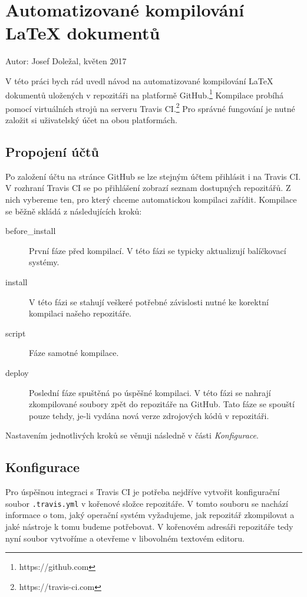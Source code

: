 \documentclass[a4paper]{article}
\begin{document}
\section*{Automatizované kompilování \LaTeX{} dokumentů}
Autor: Josef Doležal, květen 2017

\bigskip

\noindent{}V této práci bych rád uvedl návod na automatizované kompilování \LaTeX{} dokumentů uložených v repozitáři na platformě GitHub.\footnote{https://github.com}
Kompilace probíhá pomocí virtuálních strojů na serveru Travis CI.\footnote{https://travis-ci.com}
Pro správné fungování je nutné založit si uživatelský účet na obou platformách.

\subsection*{Propojení účtů}

Po založení účtu na stránce GitHub se lze stejným účtem přihlásit i na Travis CI.
V rozhraní Travis CI se po přihlášení zobrazí seznam dostupných repozitářů.
Z nich vybereme ten, pro který chceme automatickou kompilaci zařídit.
Kompilace se běžně skládá z následujících kroků:

\begin{description}
    \item[before\_install] První fáze před kompilací.
    V této fázi se typicky aktualizují balíčkovací systémy.
    \item[install] V této fázi se stahují veškeré potřebné závislosti nutné ke korektní kompilaci našeho repozitáře.
    \item[script] Fáze samotné kompilace.
    \item[deploy] Poslední fáze spuštěná po úspěšné kompilaci.
    V této fázi se nahrají zkompilované soubory zpět do repozitáře na GitHub.
    Tato fáze se spouští pouze tehdy, je-li vydána nová verze zdrojových kódů v repozitáři.
\end{description}

Nastavením jednotlivých kroků se věnuji následně v části \textit{Konfigurace}.

\subsection*{Konfigurace}

Pro úspěšnou integraci s Travis CI je potřeba nejdříve vytvořit konfigurační soubor \texttt{.travis.yml} v kořenové složce repozitáře.
V tomto souboru se nachází informace o tom, jaký operační systém vyžadujeme, jak repozitář zkompilovat a jaké nástroje k tomu budeme potřebovat.
V kořenovém adresáři repozitáře tedy nyní soubor vytvoříme a otevřeme v libovolném textovém editoru.
\end{document}
